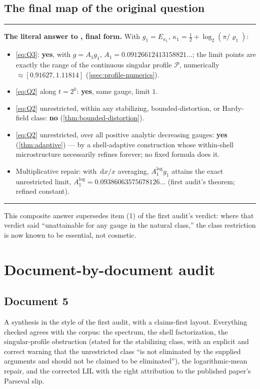 \documentclass[11pt,oneside]{article}
\theoremstyle{definition}
\theoremstyle{remark}
\newcommand{\dd}{\,\mathrm d}
\newenvironment{boxedremark}{%
  \par\smallskip\noindent\begin{center}\begin{minipage}{0.94\textwidth}%
  \color{black}\hrule\vspace{0.6em}\small
}{%
  \vspace{0.6em}\hrule\end{minipage}\end{center}\smallskip
}
\begin{document}
\subsection{The final map of the original question}
\label{ssec:final-map}

\begin{boxedremark}
\textbf{The literal answer to \cite{mse-decay}, final form.}
With $g_1=E_{\kappa_1}$, $\kappa_1=\frac12+\log_2(\pi/\varrho_1)$:
\begin{itemize}
\item \eqref{eq:Q3}: \textbf{yes}, with $g=A_1g_1$,
$A_1=0.09126612413158821\ldots$; the limit points are exactly the range
of the continuous singular profile $\mathscr P$,
numerically $\approx[0.91627,1.11814]$ (\cref{ssec:profile-numerics}).
\item \eqref{eq:Q2} along $t=2^k$: \textbf{yes}, same gauge, limit $1$.
\item \eqref{eq:Q2} unrestricted, within any stabilizing,
bounded-distortion, or Hardy-field class: \textbf{no}
(\cref{thm:bounded-distortion}).
\item \eqref{eq:Q2} unrestricted, over all positive analytic decreasing
gauges: \textbf{yes} (\cref{thm:adaptive}) --- by a shell-adaptive
construction whose within-shell microstructure necessarily refines
forever; no fixed formula does it.
\item Multiplicative repair: with $\dd x/x$ averaging, $A_1^{\log}g_1$
attains the exact unrestricted limit,
$A_1^{\log}=0.09386063575678126\ldots$ (first audit's theorem; refined
constant).
\end{itemize}
\end{boxedremark}

This composite answer supersedes item (1) of the first audit's verdict:
where that verdict said ``unattainable for any gauge in the natural
class,'' the class restriction is now known to be essential, not
cosmetic.

\section{Document-by-document audit}
\label{sec:documents}

\subsection{Document 5}
\label{ssec:doc5}

A synthesis in the style of the first audit, with a claims-first layout.
Everything checked agrees with the corpus: the spectrum, the shell
factorization, the singular-profile obstruction (stated for the
stabilizing class, with an explicit and correct warning that the
unrestricted class ``is not eliminated by the supplied arguments and
should not be claimed to be eliminated''), the logarithmic-mean repair,
and the corrected LIL with the right attribution to the published
paper's Parseval slip.
\end{document}

